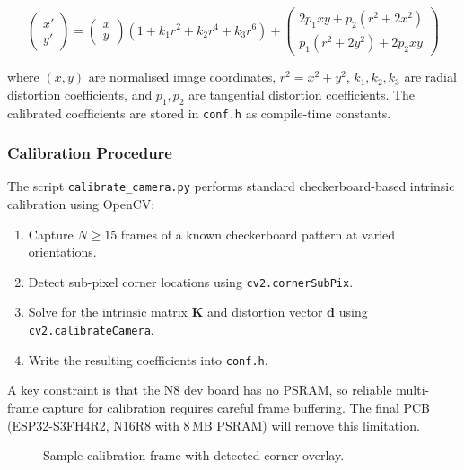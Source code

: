 \documentclass[12pt]{article}
\begin{document}
\begin{equation}
  \begin{pmatrix} x' \\ y' \end{pmatrix}
  =
  \begin{pmatrix} x \\ y \end{pmatrix}
  \left(1 + k_1 r^2 + k_2 r^4 + k_3 r^6\right)
  +
  \begin{pmatrix}
    2p_1 xy + p_2(r^2 + 2x^2) \\
    p_1(r^2 + 2y^2) + 2p_2 xy
  \end{pmatrix}
  \label{eq:distortion}
\end{equation}

where $(x, y)$ are normalised image coordinates, $r^2 = x^2 + y^2$,
$k_1, k_2, k_3$ are radial distortion coefficients, and $p_1, p_2$ are
tangential distortion coefficients.  The calibrated coefficients are stored in
\texttt{conf.h} as compile-time constants.

\subsubsection{Calibration Procedure}

The script \texttt{calibrate\_camera.py} performs standard checkerboard-based
intrinsic calibration using OpenCV:

\begin{enumerate}
  \item Capture $N \geq 15$ frames of a known checkerboard pattern at varied
        orientations.
  \item Detect sub-pixel corner locations using \texttt{cv2.cornerSubPix}.
  \item Solve for the intrinsic matrix $\mathbf{K}$ and distortion vector
        $\mathbf{d}$ using \texttt{cv2.calibrateCamera}.
  \item Write the resulting coefficients into \texttt{conf.h}.
\end{enumerate}

A key constraint is that the N8 dev board has no PSRAM, so reliable multi-frame
capture for calibration requires careful frame buffering.  The final PCB
(ESP32-S3FH4R2, N16R8 with 8\,MB PSRAM) will remove this limitation.

\begin{figure}[H]
  \centering
  \caption{Sample calibration frame with detected corner overlay.}
  \label{fig:calibration}
\end{figure}
\end{document}
